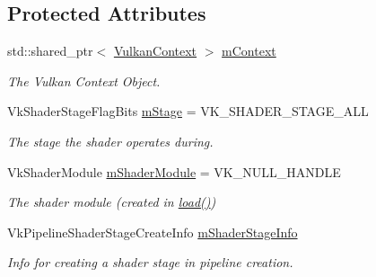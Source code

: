 \subsection*{Protected Attributes}
\begin{DoxyCompactItemize}
\item 
\mbox{\label{class_shader_ab04cb4258d4db018c279072d41390c66}} 
std\+::shared\+\_\+ptr$<$ \mbox{\hyperlink{class_vulkan_context}{Vulkan\+Context}} $>$ \mbox{\hyperlink{class_shader_ab04cb4258d4db018c279072d41390c66}{m\+Context}}
\begin{DoxyCompactList}\small\item\em The Vulkan Context Object. \end{DoxyCompactList}\item 
\mbox{\label{class_shader_ab84a76bef36eeaabace8bf76c17a7566}} 
Vk\+Shader\+Stage\+Flag\+Bits \mbox{\hyperlink{class_shader_ab84a76bef36eeaabace8bf76c17a7566}{m\+Stage}} = V\+K\+\_\+\+S\+H\+A\+D\+E\+R\+\_\+\+S\+T\+A\+G\+E\+\_\+\+A\+LL
\begin{DoxyCompactList}\small\item\em The stage the shader operates during. \end{DoxyCompactList}\item 
\mbox{\label{class_shader_af2a3f32d0763dbbea9cefc221e1f8e84}} 
Vk\+Shader\+Module \mbox{\hyperlink{class_shader_af2a3f32d0763dbbea9cefc221e1f8e84}{m\+Shader\+Module}} = V\+K\+\_\+\+N\+U\+L\+L\+\_\+\+H\+A\+N\+D\+LE
\begin{DoxyCompactList}\small\item\em The shader module (created in \mbox{\hyperlink{class_shader_a6dd75dee2ed363e1ecc5caed85fe92ba}{load()}}) \end{DoxyCompactList}\item 
\mbox{\label{class_shader_a8170f7964c1a52cf7d4662326e7ecf56}} 
Vk\+Pipeline\+Shader\+Stage\+Create\+Info \mbox{\hyperlink{class_shader_a8170f7964c1a52cf7d4662326e7ecf56}{m\+Shader\+Stage\+Info}}
\begin{DoxyCompactList}\small\item\em Info for creating a shader stage in pipeline creation. \end{DoxyCompactList}\end{DoxyCompactItemize}



